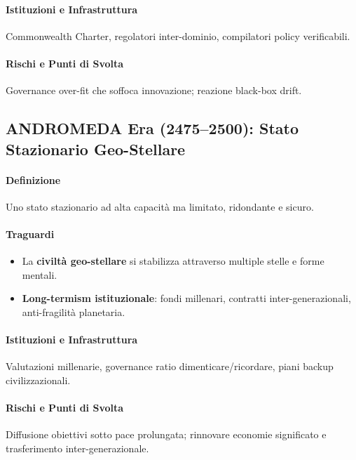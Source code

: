 \documentclass[11pt]{article}
\begin{document}
\begin{itemize}[noitemsep]
\paragraph{Istituzioni e Infrastruttura} Commonwealth Charter, regolatori inter-dominio, compilatori policy verificabili.

\paragraph{Rischi e Punti di Svolta} Governance over-fit che soffoca innovazione; reazione black-box drift.

\subsection{ANDROMEDA Era (2475–2500): Stato Stazionario Geo-Stellare}
\paragraph{Definizione} Uno stato stazionario ad alta capacità ma limitato, ridondante e sicuro.

\paragraph{Traguardi}
\begin{itemize}[noitemsep]
  \item La \textbf{civiltà geo-stellare} si stabilizza attraverso multiple stelle e forme mentali.
  \item \textbf{Long-termism istituzionale}: fondi millenari, contratti inter-generazionali, anti-fragilità planetaria.
\end{itemize}

\paragraph{Istituzioni e Infrastruttura} Valutazioni millenarie, governance ratio dimenticare/ricordare, piani backup civilizzazionali.

\paragraph{Rischi e Punti di Svolta} Diffusione obiettivi sotto pace prolungata; rinnovare economie significato e trasferimento inter-generazionale.


\end{itemize}
\end{document}
